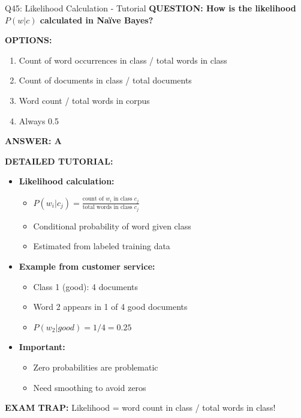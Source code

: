 \documentclass[8pt]{beamer}
\begin{document}
	\begin{frame}{Q45: Likelihood Calculation - Tutorial}
		\fontsize{6.5}{7.5}\selectfont
		\textbf{QUESTION: How is the likelihood $P(w|c)$ calculated in Naïve Bayes?}
		
		\vspace{0.1cm}
		\textbf{OPTIONS:}
		\begin{enumerate}
			\item Count of word occurrences in class / total words in class
			\item Count of documents in class / total documents
			\item Word count / total words in corpus
			\item Always 0.5
		\end{enumerate}
		
		\vspace{0.1cm}
		\textcolor{myblue}{\textbf{ANSWER: A}}
		
		\vspace{0.1cm}
		\textbf{DETAILED TUTORIAL:}
		\begin{itemize}
			\item \textbf{Likelihood calculation:}
			\begin{itemize}
				\item $P(w_i | c_j) = \frac{\text{count of } w_i \text{ in class } c_j}{\text{total words in class } c_j}$
				\item Conditional probability of word given class
				\item Estimated from labeled training data
			\end{itemize}
			\item \textbf{Example from customer service:}
			\begin{itemize}
				\item Class 1 (good): 4 documents
				\item Word 2 appears in 1 of 4 good documents
				\item $P(w_2 | good) = 1/4 = 0.25$
			\end{itemize}
			\item \textbf{Important:}
			\begin{itemize}
				\item Zero probabilities are problematic
				\item Need smoothing to avoid zeros
			\end{itemize}
		\end{itemize}
		
		\textcolor{myred}{\textbf{EXAM TRAP:}} Likelihood = \textcolor{myblue}{word count in class / total words in class}!
	\end{frame}
	
\end{document}
